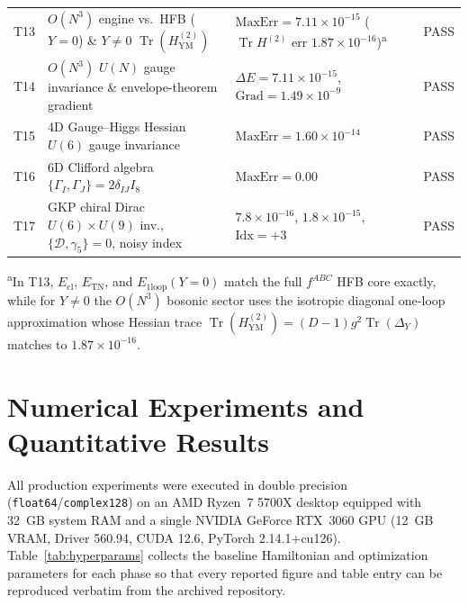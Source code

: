 \documentclass[11pt,a4paper]{article}
\DeclareMathOperator{\Tr}{Tr}
\begin{document}
\begin{table}[H]
{\begin{tabular}{@{}lllc@{}}
    T13 & $O(N^3)$ engine vs.\ HFB ($Y=0$) \& $Y\neq 0$ $\Tr(H^{(2)}_{\mathrm{YM}})$ & $\mathrm{MaxErr} = 7.11 \times 10^{-15}$ ($\Tr H^{(2)}$ err $1.87\times 10^{-16}$)\textsuperscript{a} & PASS \\
    T14 & $O(N^3)$ $U(N)$ gauge invariance \& envelope-theorem gradient & $\Delta E = 7.11 \times 10^{-15}$, $\mathrm{Grad} = 1.49 \times 10^{-9}$ & PASS \\
    T15 & 4D Gauge--Higgs Hessian $U(6)$ gauge invariance & $\mathrm{MaxErr} = 1.60 \times 10^{-14}$ & PASS \\
    T16 & 6D Clifford algebra $\{\Gamma_I, \Gamma_J\} = 2\delta_{IJ} I_8$ & $\mathrm{MaxErr} = 0.00$ & PASS \\
    T17 & GKP chiral Dirac $U(6)\times U(9)$ inv., $\{\mathcal{D},\gamma_5\}=0$, noisy index & $7.8\times 10^{-16}$, $1.8\times 10^{-15}$, $\mathrm{Idx}=+3$ & PASS \\
    \bottomrule
  \end{tabular}%
  }
  \vspace{2pt}
  {\footnotesize \textsuperscript{a}In T13, $E_{\mathrm{cl}}$, $E_{\mathrm{TN}}$, and $E_{\mathrm{1loop}}(Y=0)$ match the full $f^{ABC}$ HFB core exactly, while for $Y\neq 0$ the $O(N^3)$ bosonic sector uses the isotropic diagonal one-loop approximation whose Hessian trace $\Tr(H^{(2)}_{\mathrm{YM}}) = (D-1)g^2\Tr(\Delta_Y)$ matches to $1.87\times 10^{-16}$.}
\end{table}

\section{Numerical Experiments and Quantitative Results}
\label{sec:results}

All production experiments were executed in double precision (\texttt{float64}/\texttt{complex128}) on an AMD Ryzen~7 5700X desktop equipped with 32~GB system RAM and a single NVIDIA GeForce RTX~3060 GPU (12~GB VRAM, Driver 560.94, CUDA 12.6, PyTorch 2.14.1+cu126). Table~\ref{tab:hyperparams} collects the baseline Hamiltonian and optimization parameters for each phase so that every reported figure and table entry can be reproduced verbatim from the archived repository.
\end{document}
